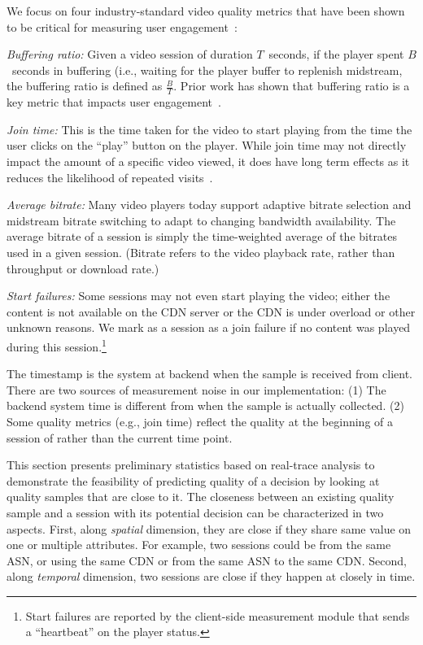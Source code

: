  We focus on four industry-standard video quality metrics that have been shown to be critical for measuring user engagement~\cite{sigcomm11}:
\begin{packedenumerate}
\item \emph{Buffering ratio:}  Given a video session of duration $T$~seconds,
if the player spent $B$~seconds in buffering (i.e., waiting for the player
 buffer to replenish midstream, the buffering ratio is defined as
 $\frac{B}{T}$. Prior work has shown that buffering ratio is a key metric
 that impacts user engagement~\cite{sigcomm11}.
\item \emph{Join time:}  This is the time taken for the video to start playing
 from the time the user clicks on the ``play'' button on the player.
 While join time may not directly impact the amount of a specific video viewed,
 it does have long term effects as it reduces the likelihood of repeated
visits~\cite{sigcomm11,akamai-imc12}.
\item \emph{Average bitrate:} Many video players today support adaptive bitrate
selection and midstream bitrate switching to adapt to changing bandwidth
availability. The average bitrate of a session is simply the time-weighted
average of the bitrates used in a given session. (Bitrate refers to the video playback rate, rather than throughput or download rate.)
\item \emph{Start failures:}   Some sessions may not even start playing the
video; either the content is not available on the CDN server or the CDN is
under overload or other unknown reasons. We mark as a session as a join failure
if no content was played during this session.\footnote{Start failures are
reported by the client-side measurement module that sends a ``heartbeat'' on
the player status.}
\end{packedenumerate}

 The timestamp is the system at backend when the sample is received from client. There are two sources of measurement noise in our implementation: (1) The backend system time is different from when the sample is actually collected. (2) Some quality metrics (e.g., join time) reflect the quality at the beginning of a session of rather than the current time point. 


\label{subsec:similarity}

This section presents preliminary statistics based on real-trace analysis to demonstrate the feasibility of predicting quality of a decision by looking at quality samples that are close to it. The closeness between an existing quality sample and a session with its potential decision can be characterized in two aspects. First, along {\it spatial} dimension, they are close if they share same value on one or multiple attributes. For example, two sessions could be from the same ASN, or using the same CDN or from the same ASN to the same CDN. Second, along {\it temporal} dimension, two sessions are close if they happen at closely in time.

